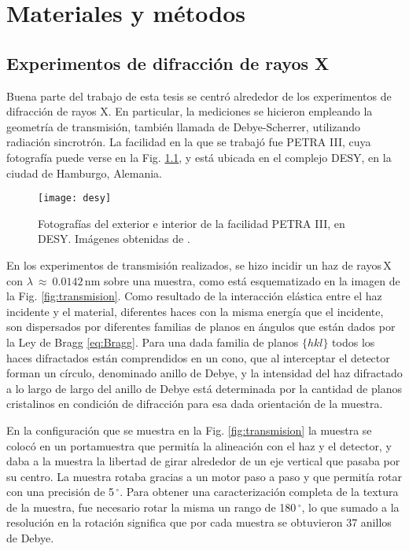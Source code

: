 \chapter{Materiales y métodos}\label{C:Materiales}
\graphicspath{{./figs/02_Mat/}}
\section{Experimentos de difracción de rayos X}\label{S:MatXRD}
Buena parte del trabajo de esta tesis se centró alrededor de los experimentos de difracción de rayos X.
En particular, la mediciones se hicieron empleando la geometría de transmisión, también llamada de Debye-Scherrer, utilizando radiación sincrotrón.
La facilidad en la que se trabajó fue PETRA III, cuya fotografía puede verse en la Fig. \ref{fig:desyfoto}, y está ubicada en el complejo DESY, en la ciudad de Hamburgo, Alemania\cite{desy}.

\begin{figure}[!htb] 
  \centering
  \texttt{[image: desy]}
  \caption{Fotografías del exterior e interior de la facilidad PETRA III, en DESY. Imágenes obtenidas de \cite{desy}.}
  \label{fig:desyfoto}
\end{figure}

En los experimentos de transmisión realizados, se hizo incidir un haz de rayos\,X con $\lambda \ \approx \ 0.0142$\,nm sobre una muestra, como está esquematizado en la imagen de la Fig. \ref{fig:transmision}. 
Como resultado de la interacción elástica entre el haz incidente y el material, diferentes haces con la misma energía que el incidente, son dispersados por diferentes familias de planos en ángulos que están dados por la Ley de Bragg \ref{eq:Bragg}.
Para una dada familia de planos $\{hkl\}$ todos los haces difractados están comprendidos en un cono, que al interceptar el detector forman un círculo, denominado anillo de Debye, y la intensidad del haz difractado a lo largo de largo del anillo de Debye está determinada por la cantidad de planos cristalinos en condición de difracción para esa dada orientación de la muestra.

En la configuración que se muestra en la Fig. \ref{fig:transmision} la muestra se colocó en un portamuestra que permitía la alineación con el haz y el detector, y daba a la muestra la libertad de girar alrededor de un eje vertical que pasaba por su centro.
La muestra rotaba gracias a un motor paso a paso y que permitía rotar con una precisión de 5\,$^{\circ}$.
Para obtener una caracterización completa de la textura de la muestra, fue necesario rotar la misma un rango de 180\,$^{\circ}$, lo que sumado a la resolución en la rotación significa que por cada muestra se obtuvieron 37 anillos de Debye.

